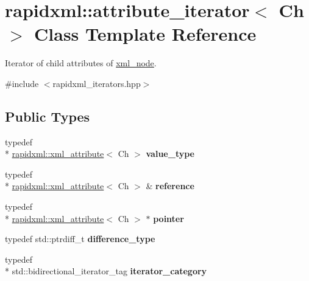 \hypertarget{classrapidxml_1_1attribute__iterator}{\section{rapidxml\-:\-:attribute\-\_\-iterator$<$ Ch $>$ Class Template Reference}
\label{classrapidxml_1_1attribute__iterator}
}


Iterator of child attributes of \hyperlink{classrapidxml_1_1xml__node}{xml\-\_\-node}.  




{\ttfamily \#include $<$rapidxml\-\_\-iterators.\-hpp$>$}

\subsection*{Public Types}
\begin{DoxyCompactItemize}
\item 
\hypertarget{classrapidxml_1_1attribute__iterator_ad49f6c325911b2810194d79150e15f9b}{typedef \\*
\hyperlink{classrapidxml_1_1xml__attribute}{rapidxml\-::xml\-\_\-attribute}$<$ Ch $>$ {\bfseries value\-\_\-type}}\label{classrapidxml_1_1attribute__iterator_ad49f6c325911b2810194d79150e15f9b}

\item 
\hypertarget{classrapidxml_1_1attribute__iterator_ac809042d6894f7830a0895285b12166b}{typedef \\*
\hyperlink{classrapidxml_1_1xml__attribute}{rapidxml\-::xml\-\_\-attribute}$<$ Ch $>$ \& {\bfseries reference}}\label{classrapidxml_1_1attribute__iterator_ac809042d6894f7830a0895285b12166b}

\item 
\hypertarget{classrapidxml_1_1attribute__iterator_a4bdab91c8d7f88ba6038c7c4d714024f}{typedef \\*
\hyperlink{classrapidxml_1_1xml__attribute}{rapidxml\-::xml\-\_\-attribute}$<$ Ch $>$ $\ast$ {\bfseries pointer}}\label{classrapidxml_1_1attribute__iterator_a4bdab91c8d7f88ba6038c7c4d714024f}

\item 
\hypertarget{classrapidxml_1_1attribute__iterator_accfd6d8527d32b427496b42f71a2e37a}{typedef std\-::ptrdiff\-\_\-t {\bfseries difference\-\_\-type}}\label{classrapidxml_1_1attribute__iterator_accfd6d8527d32b427496b42f71a2e37a}

\item 
\hypertarget{classrapidxml_1_1attribute__iterator_a97ac5d8b98f5b03c68cc566f5ac0a9e0}{typedef \\*
std\-::bidirectional\-\_\-iterator\-\_\-tag {\bfseries iterator\-\_\-category}}\label{classrapidxml_1_1attribute__iterator_a97ac5d8b98f5b03c68cc566f5ac0a9e0}

\end{DoxyCompactItemize}
